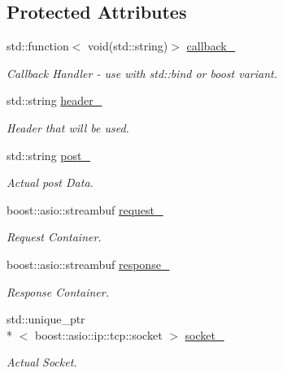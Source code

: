\subsection*{Protected Attributes}
\begin{DoxyCompactItemize}
\item 
std\-::function$<$ void(std\-::string)$>$ \hyperlink{classrapp_1_1services_1_1asio__service__http_a7ad60e0e171d8953da18e0c4e3974a80}{callback\-\_\-}
\begin{DoxyCompactList}\small\item\em Callback Handler -\/ use with std\-::bind or boost variant. \end{DoxyCompactList}\item 
std\-::string \hyperlink{classrapp_1_1services_1_1asio__service__http_ad2fbb8fb1f17c8ad6022ecbf13bc769c}{header\-\_\-}
\begin{DoxyCompactList}\small\item\em Header that will be used. \end{DoxyCompactList}\item 
std\-::string \hyperlink{classrapp_1_1services_1_1asio__service__http_a08e5b2c94340f528191e7840656be121}{post\-\_\-}
\begin{DoxyCompactList}\small\item\em Actual post Data. \end{DoxyCompactList}\item 
boost\-::asio\-::streambuf \hyperlink{classrapp_1_1services_1_1asio__service__http_a003a0577751d30d2370bff9a20d46746}{request\-\_\-}
\begin{DoxyCompactList}\small\item\em Request Container. \end{DoxyCompactList}\item 
boost\-::asio\-::streambuf \hyperlink{classrapp_1_1services_1_1asio__service__http_a5b1a5c59d1407fec9f0ccbe372bdac3a}{response\-\_\-}
\begin{DoxyCompactList}\small\item\em Response Container. \end{DoxyCompactList}\item 
std\-::unique\-\_\-ptr\\*
$<$ boost\-::asio\-::ip\-::tcp\-::socket $>$ \hyperlink{classrapp_1_1services_1_1asio__service__http_ad3411584026eb6c31ac78943266e7858}{socket\-\_\-}
\begin{DoxyCompactList}\small\item\em Actual Socket. \end{DoxyCompactList}\end{DoxyCompactItemize}


